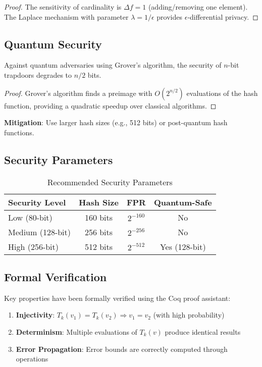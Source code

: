 \documentclass[../main_comprehensive.tex]{subfiles}
\begin{document}
\begin{proof}
The sensitivity of cardinality is $\Delta f = 1$ (adding/removing one element). The Laplace mechanism with parameter $\lambda = 1/\epsilon$ provides $\epsilon$-differential privacy.
\end{proof}

\subsection{Quantum Security}

\begin{theorem}
Against quantum adversaries using Grover's algorithm, the security of $n$-bit trapdoors degrades to $n/2$ bits.
\end{theorem}

\begin{proof}
Grover's algorithm finds a preimage with $O(2^{n/2})$ evaluations of the hash function, providing a quadratic speedup over classical algorithms.
\end{proof}

\textbf{Mitigation}: Use larger hash sizes (e.g., 512 bits) or post-quantum hash functions.

\subsection{Security Parameters}

\begin{table}[h]
\centering
\caption{Recommended Security Parameters}
\begin{tabular}{lccc}
\toprule
Security Level & Hash Size & FPR & Quantum-Safe \\
\midrule
Low (80-bit) & 160 bits & $2^{-160}$ & No \\
Medium (128-bit) & 256 bits & $2^{-256}$ & No \\
High (256-bit) & 512 bits & $2^{-512}$ & Yes (128-bit) \\
\bottomrule
\end{tabular}
\end{table}

\subsection{Formal Verification}

Key properties have been formally verified using the Coq proof assistant:

\begin{enumerate}
\item \textbf{Injectivity}: $T_k(v_1) = T_k(v_2) \Rightarrow v_1 = v_2$ (with high probability)
\item \textbf{Determinism}: Multiple evaluations of $T_k(v)$ produce identical results
\item \textbf{Error Propagation}: Error bounds are correctly computed through operations
\end{enumerate}
\end{document}
